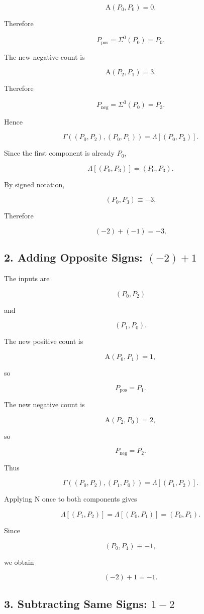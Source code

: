 \documentclass[12pt]{article}
\newcommand{\Alpha}{\mathrm{A}}
\newcommand{\Nu}{\mathrm{N}}
\begin{document}
\[
\Alpha(P_0,P_0)=0.
\]

Therefore

\[
P_{\mathrm{pos}}
=
\Sigma^0(P_0)
=
P_0.
\]

The new negative count is

\[
\Alpha(P_2,P_1)=3.
\]

Therefore

\[
P_{\mathrm{neg}}
=
\Sigma^3(P_0)
=
P_3.
\]

Hence

\[
\Gamma
\left(
(P_0,P_2),(P_0,P_1)
\right)
=
\Lambda[(P_0,P_3)].
\]

Since the first component is already \(P_0\),

\[
\Lambda[(P_0,P_3)]
=
(P_0,P_3).
\]

By signed notation,

\[
(P_0,P_3)\equiv-3.
\]

Therefore

\[
\boxed{
(-2)+(-1)=-3.
}
\]

\subsection*{2. Adding Opposite Signs: \((-2)+1\)}

The inputs are

\[
(P_0,P_2)
\]

and

\[
(P_1,P_0).
\]

The new positive count is

\[
\Alpha(P_0,P_1)=1,
\]

so

\[
P_{\mathrm{pos}}=P_1.
\]

The new negative count is

\[
\Alpha(P_2,P_0)=2,
\]

so

\[
P_{\mathrm{neg}}=P_2.
\]

Thus

\[
\Gamma
\left(
(P_0,P_2),(P_1,P_0)
\right)
=
\Lambda[(P_1,P_2)].
\]

Applying \(\Nu\) once to both components gives

\[
\Lambda[(P_1,P_2)]
=
\Lambda[(P_0,P_1)]
=
(P_0,P_1).
\]

Since

\[
(P_0,P_1)\equiv-1,
\]

we obtain

\[
\boxed{
(-2)+1=-1.
}
\]

\subsection*{3. Subtracting Same Signs: \(1-2\)}
\end{document}
